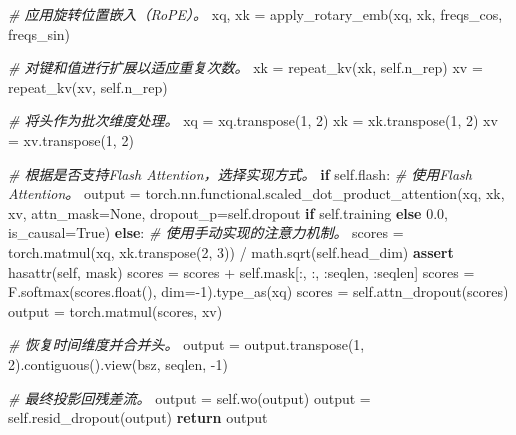 \documentclass[
]{article}
\newenvironment{Shaded}{}{}
\newcommand{\BuiltInTok}[1]{\textcolor[rgb]{0.00,0.50,0.00}{#1}}
\newcommand{\CommentTok}[1]{\textcolor[rgb]{0.38,0.63,0.69}{\textit{#1}}}
\newcommand{\ControlFlowTok}[1]{\textcolor[rgb]{0.00,0.44,0.13}{\textbf{#1}}}
\newcommand{\DecValTok}[1]{\textcolor[rgb]{0.25,0.63,0.44}{#1}}
\newcommand{\FloatTok}[1]{\textcolor[rgb]{0.25,0.63,0.44}{#1}}
\newcommand{\NormalTok}[1]{#1}
\newcommand{\OperatorTok}[1]{\textcolor[rgb]{0.40,0.40,0.40}{#1}}
\newcommand{\StringTok}[1]{\textcolor[rgb]{0.25,0.44,0.63}{#1}}
\newcommand{\VariableTok}[1]{\textcolor[rgb]{0.10,0.09,0.49}{#1}}
\begin{document}
\begin{Shaded}
\begin{Highlighting}[]
        \CommentTok{\# 应用旋转位置嵌入（RoPE）。}
\NormalTok{        xq, xk }\OperatorTok{=}\NormalTok{ apply\_rotary\_emb(xq, xk, freqs\_cos, freqs\_sin)}

        \CommentTok{\# 对键和值进行扩展以适应重复次数。}
\NormalTok{        xk }\OperatorTok{=}\NormalTok{ repeat\_kv(xk, }\VariableTok{self}\NormalTok{.n\_rep)}
\NormalTok{        xv }\OperatorTok{=}\NormalTok{ repeat\_kv(xv, }\VariableTok{self}\NormalTok{.n\_rep)}

        \CommentTok{\# 将头作为批次维度处理。}
\NormalTok{        xq }\OperatorTok{=}\NormalTok{ xq.transpose(}\DecValTok{1}\NormalTok{, }\DecValTok{2}\NormalTok{)}
\NormalTok{        xk }\OperatorTok{=}\NormalTok{ xk.transpose(}\DecValTok{1}\NormalTok{, }\DecValTok{2}\NormalTok{)}
\NormalTok{        xv }\OperatorTok{=}\NormalTok{ xv.transpose(}\DecValTok{1}\NormalTok{, }\DecValTok{2}\NormalTok{)}

        \CommentTok{\# 根据是否支持Flash Attention，选择实现方式。}
        \ControlFlowTok{if} \VariableTok{self}\NormalTok{.flash:}
            \CommentTok{\# 使用Flash Attention。}
\NormalTok{            output }\OperatorTok{=}\NormalTok{ torch.nn.functional.scaled\_dot\_product\_attention(xq, xk, xv, attn\_mask}\OperatorTok{=}\VariableTok{None}\NormalTok{, dropout\_p}\OperatorTok{=}\VariableTok{self}\NormalTok{.dropout }\ControlFlowTok{if} \VariableTok{self}\NormalTok{.training }\ControlFlowTok{else} \FloatTok{0.0}\NormalTok{, is\_causal}\OperatorTok{=}\VariableTok{True}\NormalTok{)}
        \ControlFlowTok{else}\NormalTok{:}
            \CommentTok{\# 使用手动实现的注意力机制。}
\NormalTok{            scores }\OperatorTok{=}\NormalTok{ torch.matmul(xq, xk.transpose(}\DecValTok{2}\NormalTok{, }\DecValTok{3}\NormalTok{)) }\OperatorTok{/}\NormalTok{ math.sqrt(}\VariableTok{self}\NormalTok{.head\_dim)}
            \ControlFlowTok{assert} \BuiltInTok{hasattr}\NormalTok{(}\VariableTok{self}\NormalTok{, }\StringTok{\textquotesingle{}mask\textquotesingle{}}\NormalTok{)}
\NormalTok{            scores }\OperatorTok{=}\NormalTok{ scores }\OperatorTok{+} \VariableTok{self}\NormalTok{.mask[:, :, :seqlen, :seqlen]}
\NormalTok{            scores }\OperatorTok{=}\NormalTok{ F.softmax(scores.}\BuiltInTok{float}\NormalTok{(), dim}\OperatorTok{={-}}\DecValTok{1}\NormalTok{).type\_as(xq)}
\NormalTok{            scores }\OperatorTok{=} \VariableTok{self}\NormalTok{.attn\_dropout(scores)}
\NormalTok{            output }\OperatorTok{=}\NormalTok{ torch.matmul(scores, xv)}

        \CommentTok{\# 恢复时间维度并合并头。}
\NormalTok{        output }\OperatorTok{=}\NormalTok{ output.transpose(}\DecValTok{1}\NormalTok{, }\DecValTok{2}\NormalTok{).contiguous().view(bsz, seqlen, }\OperatorTok{{-}}\DecValTok{1}\NormalTok{)}

        \CommentTok{\# 最终投影回残差流。}
\NormalTok{        output }\OperatorTok{=} \VariableTok{self}\NormalTok{.wo(output)}
\NormalTok{        output }\OperatorTok{=} \VariableTok{self}\NormalTok{.resid\_dropout(output)}
        \ControlFlowTok{return}\NormalTok{ output}
\end{Highlighting}
\end{Shaded}
\end{document}
